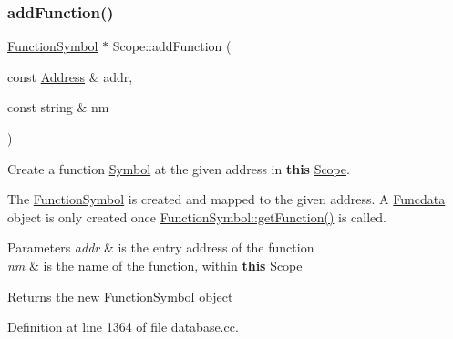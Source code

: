 \subsubsection{\texorpdfstring{addFunction()}{addFunction()}}
{\footnotesize\ttfamily \mbox{\hyperlink{class_function_symbol}{Function\+Symbol}} $\ast$ Scope\+::add\+Function (\begin{DoxyParamCaption}\item[{const \mbox{\hyperlink{class_address}{Address}} \&}]{addr,  }\item[{const string \&}]{nm }\end{DoxyParamCaption})}



Create a function \mbox{\hyperlink{class_symbol}{Symbol}} at the given address in {\bfseries{this}} \mbox{\hyperlink{class_scope}{Scope}}. 

The \mbox{\hyperlink{class_function_symbol}{Function\+Symbol}} is created and mapped to the given address. A \mbox{\hyperlink{class_funcdata}{Funcdata}} object is only created once \mbox{\hyperlink{class_function_symbol_ab54ed780e0dd1abdc9447c2e772114fb}{Function\+Symbol\+::get\+Function()}} is called. 
\begin{DoxyParams}{Parameters}
{\em addr} & is the entry address of the function \\
\hline
{\em nm} & is the name of the function, within {\bfseries{this}} \mbox{\hyperlink{class_scope}{Scope}} \\
\hline
\end{DoxyParams}
\begin{DoxyReturn}{Returns}
the new \mbox{\hyperlink{class_function_symbol}{Function\+Symbol}} object 
\end{DoxyReturn}


Definition at line 1364 of file database.\+cc.

